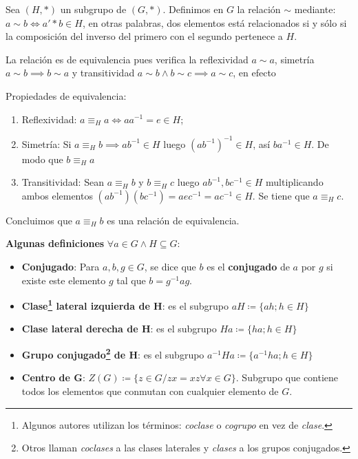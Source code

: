 	Sea $(H, *)$ un subgrupo de $(G, *)$. Definimos en $G$ la relación $\sim$ mediante: $a \sim b \iff a' * b \in H$, en otras palabras, dos elementos está relacionados si y sólo si la composición del inverso del primero con el segundo pertenece a $H$.
	
	La relación es de equivalencia pues verifica la reflexividad $a \sim a$, simetría $a\sim b \implies b \sim a$ y transitividad $a\sim b \land b \sim c \implies a \sim c$, en efecto
	
	\begin{fmd-proof} Propiedades de equivalencia:
		\begin{enumerate}[label=\roman*)]
			\item Reflexividad: $a \equiv_{H} a \iff aa^{-1} = e \in H$;
			\item Simetría: Si $a \equiv_{H} b \implies ab^{-1} \in H$ luego $(ab^{-1})^{-1} \in H$, así $ba^{-1} \in H$. De modo que $b \equiv_{H} a$
			\item Transitividad: Sean $a \equiv_{H} b$ y $b \equiv_{H} c$ luego $ab^{-1}, bc^{-1} \in H$ multiplicando ambos elementos $\left(ab^{-1}\right) \left(bc^{-1}\right) = aec^{-1} = ac^{-1} \in H$. Se tiene que $a \equiv_{H} c$.
		\end{enumerate}
		Concluimos que $a \equiv_{H} b$ es una relación de equivalencia.
	\end{fmd-proof}
	
	\textbf{Algunas definiciones} $\forall a \in G \land H \subseteq G$:
	\begin{itemize}
		\item \textbf{Conjugado}: Para $a,b, g \in G$, se dice que $b$ es el \textbf{conjugado} de $a$ por $g$ si existe este elemento $g$ tal que $b = g^{-1}ag$.
		\item \textbf{Clase\footnote{Algunos autores utilizan los términos: \textit{coclase} o \textit{cogrupo} en vez de \textit{clase}.} lateral izquierda de H}: es el subgrupo $aH \coloneqq \{ah; h \in H\} $
		\item \textbf{Clase lateral derecha de H}: es el subgrupo $Ha \coloneqq \{ha; h \in H\} $
		\item \textbf{Grupo conjugado\footnote{Otros llaman \textit{coclases} a las clases laterales y \textit{clases} a los grupos conjugados.} de H}: es el subgrupo $a^{-1}Ha \coloneqq \{a^{-1}ha; h \in H\} $
		\item \textbf{Centro de G}: $Z(G) \coloneqq \{z\in G / zx = xz \forall x \in G\}$. Subgrupo que contiene todos los elementos que conmutan con cualquier elemento de $G$.
	\end{itemize}
	
